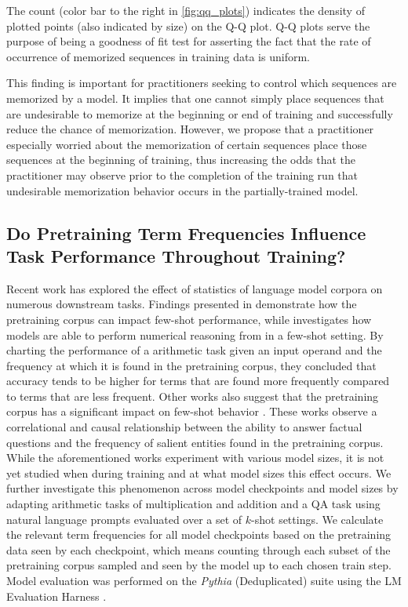 The count (color bar to the right in \ref{fig:qq_plots}) indicates the density of plotted points (also indicated by size) on the Q-Q plot. Q-Q plots serve the purpose of being a goodness of fit test for asserting the fact that the rate of occurrence of memorized sequences in training data is uniform.

This finding is important for practitioners seeking to control which sequences are memorized by a model. It implies that one cannot simply place sequences that are undesirable to memorize at the beginning or end of training and successfully reduce the chance of memorization. However, we propose that a practitioner especially worried about the memorization of certain sequences place those sequences at the beginning of training, thus increasing the odds that the practitioner may observe prior to the completion of the training run that undesirable memorization behavior occurs in the partially-trained model.

\subsection{Do Pretraining Term Frequencies Influence Task Performance Throughout Training?}

Recent work has explored the effect of statistics of language model corpora on numerous downstream tasks. Findings presented in \citet{shin2022effect} demonstrate how the pretraining corpus can impact few-shot performance, while \citet{razeghi2022impact} investigates how models are able to perform numerical reasoning from in a few-shot setting. By charting the performance of a arithmetic task given an input operand and the frequency at which it is found in the pretraining corpus, they concluded that accuracy tends to be higher for terms that are found more frequently compared to terms that are less frequent. Other works also suggest that the pretraining corpus has a significant impact on few-shot behavior \citep{elazar2022measuring,kandpal2022large}. These works observe a correlational and causal relationship between the ability to answer factual questions and the frequency of salient entities found in the pretraining corpus. While the aforementioned works experiment with various model sizes, it is not yet studied when during training and at what model sizes this effect occurs. We further investigate this phenomenon across model checkpoints and model sizes by adapting arithmetic tasks of multiplication and addition \citep{razeghi2022impact} and a QA task \citep{kandpal2022large} using natural language prompts evaluated over a set of $k$-shot settings. We calculate the relevant term frequencies for all model checkpoints based on the pretraining data seen by each checkpoint, which means counting through each subset of the pretraining corpus sampled and seen by the model up to each chosen train step. Model evaluation was performed on the \textit{Pythia} (Deduplicated) suite using the LM Evaluation Harness \cite{gao2021eval}.

